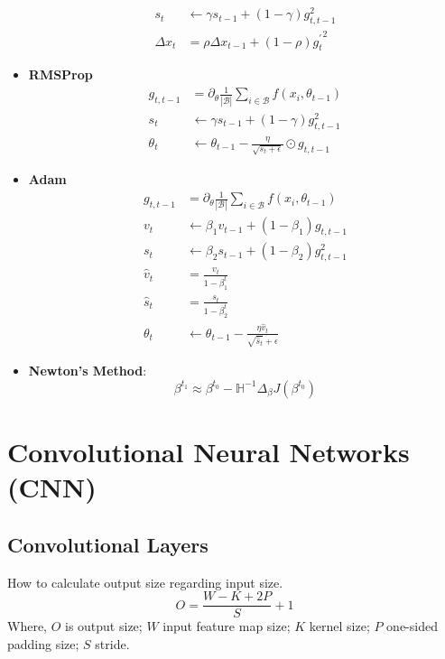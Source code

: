 \documentclass[a4paper]{article}
\begin{document}
\begin{itemize}
\begin{align}
		s_t &\leftarrow \gamma s_{t-1} + (1 - \gamma) g_{t, t-1}^2	 \\
		\Delta x_t &= \rho \Delta x_{t-1} + (1 - \rho) {g_t^{\prime}}^2
	\end{align}
	\item \textbf{RMSProp}
	\begin{align}
		g_{t, t-1} &= \partial_{\theta} \frac{1}{|\mathcal{B}|} \sum_{i \in \mathcal{B}} f(x_i, \theta_{t-1}) \\
		s_t &\leftarrow \gamma s_{t-1} + (1 - \gamma) g_{t, t-1}^2	 \\
		\theta_{t} &\leftarrow \theta_{t-1} - \frac{\eta}{\sqrt{s_t + \epsilon}} \odot g_{t, t-1}
	\end{align}
	\item \textbf{Adam}
	\begin{align}
		g_{t, t-1} &= \partial_{\theta} \frac{1}{|\mathcal{B}|} \sum_{i \in \mathcal{B}} f(x_i, \theta_{t-1}) \\
		v_t &\leftarrow \beta_1 v_{t-1} + (1 - \beta_1) g_{t, t-1}	 \\
		s_t &\leftarrow \beta_2 s_{t-1} + (1 - \beta_2) g_{t, t-1}^2	 \\
		\hat{v}_t &= \frac{v_t}{1 - {\beta}_1^{t}} \\
		\hat{s}_t &= \frac{s_t}{1 - {\beta}_2^{t}} \\
		\theta_{t} &\leftarrow \theta_{t-1} - \frac{\eta \hat{v}_t}{\sqrt{\hat{s}_t} + \epsilon}
	\end{align}
	\item \textbf{Newton's Method}:
	\begin{equation}
		\mathbb{\beta}^{t_1} \approx \mathbb{\beta}^{t_0} - \mathbb{H}^{-1} \Delta_{\beta} J (\mathbb{\beta}^{t_0})
	\end{equation}
\end{itemize}

\section{Convolutional Neural Networks (CNN)}

\subsection{Convolutional Layers}

How to calculate output size regarding input size.
\begin{equation}
	O = \frac{W - K + 2P}{S} + 1
\end{equation}
Where, $O$ is output size; $W$ input feature map size; $K$ kernel size; $P$ one-sided padding size; $S$ stride.
\end{document}
